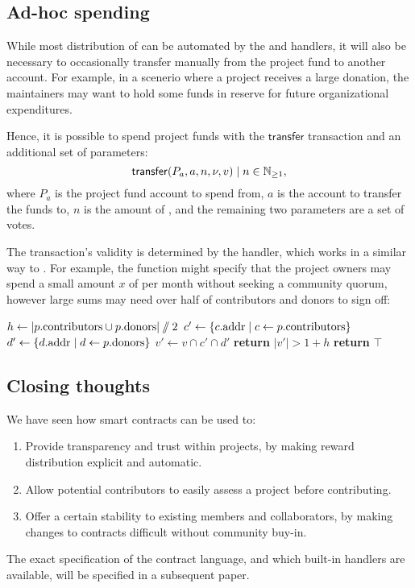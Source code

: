\subsection{Ad-hoc spending}

While most distribution of \oscoin{} can be automated by the 
and  handlers, it will also be necessary to occasionally
transfer \oscoin{} manually from the project fund to another account. For example, in
a scenerio where a project receives a large donation, the
maintainers may want to hold some funds in reserve for future organizational expenditures.

Hence, it is possible to spend project funds with the $\mathsf{transfer}$
transaction and an additional set of parameters:
\[
    \mathsf{transfer}\lparen P_a, a, n, \nu, v\rparen \mid n \in \mathbb{N}_{\geq 1},
\]
where $P_a$ is the project fund account to spend from, $a$ is the account to
transfer the funds to, $n$ is the amount of \oscoin{}, and the remaining two
parameters are a set of votes.


The transaction's validity is determined by the  handler,
which works in a similar way to . For
example, the function might specify that the project owners may spend a small
amount $x$ of \oscoin{} per month without seeking a community quorum, however
large sums may need over half of contributors and donors to sign off:
\medskip
\begin{algorithmic}[0]
            \State $h \gets |p.{\mathrm{contributors}} \cup p.{\mathrm{donors}}| \sslash 2$
            \State $c' \gets \{ c.{\mathrm{addr}} \mid c \gets p.{\mathrm{contributors}} \}$
            \State $d' \gets \{ d.{\mathrm{addr}} \mid d \gets p.{\mathrm{donors}} \}$
            \State $v' \gets v \cap c' \cap d'$
            \State \textbf{return} $|v'| > 1 + h$
            \Else
            \State \textbf{return} $\top$
        \EndIf
    \EndProcedure
\end{algorithmic}

\subsection{Closing thoughts}

We have seen how smart contracts can be used to:

\begin{enumerate}
    \item Provide transparency and trust within projects, by making reward
        distribution explicit and automatic.
    \item Allow potential contributors to easily assess a project before contributing.
    \item Offer a certain stability to existing members and collaborators, by
        making changes to contracts difficult without community buy-in.
\end{enumerate}

The exact specification of the contract language, and which built-in handlers
are available, will be specified in a subsequent paper.
